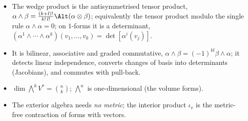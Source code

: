 \begin{keypoints}
\begin{itemize}
\item The wedge product is the antisymmetrised tensor product, $\alpha\wedge\beta=\frac{(k+l)!}{k!\,l!}\Alt(\alpha\otimes\beta)$; equivalently the tensor product modulo the single rule $\alpha\wedge\alpha=0$; on $1$-forms it is a determinant, $(\alpha^1\wedge\cdots\wedge\alpha^k)(v_1,\dots,v_k)=\det[\alpha^i(v_j)]$.
\item It is bilinear, associative and graded commutative, $\alpha\wedge\beta=(-1)^{kl}\beta\wedge\alpha$; it detects linear independence, converts changes of basis into determinants (Jacobians), and commutes with pull-back.
\item $\dim\bigwedge^kV^*=\binom nk$; $\bigwedge^n$ is one-dimensional (the volume forms).
\item The exterior algebra needs \emph{no metric}; the interior product $\iota_v$ is the metric-free contraction of forms with vectors.
\end{itemize}
\end{keypoints}

